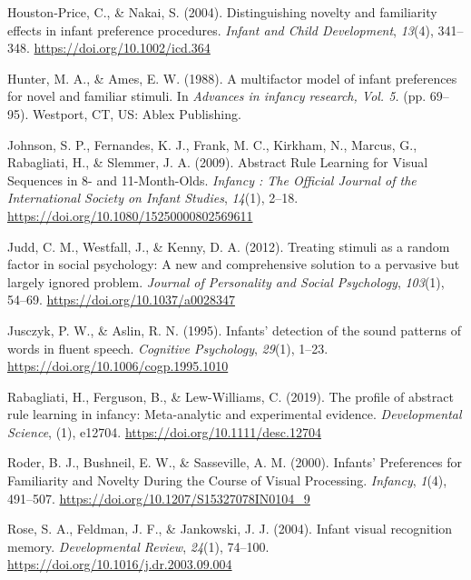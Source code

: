 \documentclass[english,man,man,floatsintext]{apa6}
\begin{document}
\leavevmode\hypertarget{ref-houston-price2004}{}%
Houston‐Price, C., \& Nakai, S. (2004). Distinguishing novelty and familiarity effects in infant preference procedures. \emph{Infant and Child Development}, \emph{13}(4), 341--348. \url{https://doi.org/10.1002/icd.364}

\leavevmode\hypertarget{ref-hunter1988}{}%
Hunter, M. A., \& Ames, E. W. (1988). A multifactor model of infant preferences for novel and familiar stimuli. In \emph{Advances in infancy research, Vol. 5.} (pp. 69--95). Westport, CT, US: Ablex Publishing.

\leavevmode\hypertarget{ref-johnson2009}{}%
Johnson, S. P., Fernandes, K. J., Frank, M. C., Kirkham, N., Marcus, G., Rabagliati, H., \& Slemmer, J. A. (2009). Abstract Rule Learning for Visual Sequences in 8- and 11-Month-Olds. \emph{Infancy : The Official Journal of the International Society on Infant Studies}, \emph{14}(1), 2--18. \url{https://doi.org/10.1080/15250000802569611}

\leavevmode\hypertarget{ref-judd2012}{}%
Judd, C. M., Westfall, J., \& Kenny, D. A. (2012). Treating stimuli as a random factor in social psychology: A new and comprehensive solution to a pervasive but largely ignored problem. \emph{Journal of Personality and Social Psychology}, \emph{103}(1), 54--69. \url{https://doi.org/10.1037/a0028347}

\leavevmode\hypertarget{ref-jusczyk1995}{}%
Jusczyk, P. W., \& Aslin, R. N. (1995). Infants' detection of the sound patterns of words in fluent speech. \emph{Cognitive Psychology}, \emph{29}(1), 1--23. \url{https://doi.org/10.1006/cogp.1995.1010}

\leavevmode\hypertarget{ref-rabagliati2019}{}%
Rabagliati, H., Ferguson, B., \& Lew-Williams, C. (2019). The profile of abstract rule learning in infancy: Meta-analytic and experimental evidence. \emph{Developmental Science}, (1), e12704. \url{https://doi.org/10.1111/desc.12704}

\leavevmode\hypertarget{ref-roder2000}{}%
Roder, B. J., Bushneil, E. W., \& Sasseville, A. M. (2000). Infants' Preferences for Familiarity and Novelty During the Course of Visual Processing. \emph{Infancy}, \emph{1}(4), 491--507. \url{https://doi.org/10.1207/S15327078IN0104_9}

\leavevmode\hypertarget{ref-rose2004}{}%
Rose, S. A., Feldman, J. F., \& Jankowski, J. J. (2004). Infant visual recognition memory. \emph{Developmental Review}, \emph{24}(1), 74--100. \url{https://doi.org/10.1016/j.dr.2003.09.004}
\end{document}
